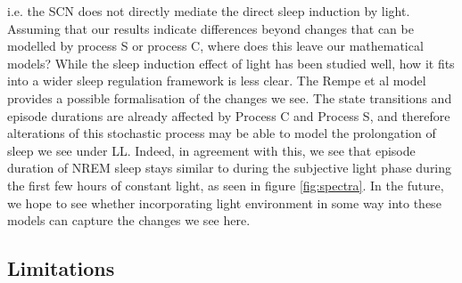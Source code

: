 i.e. the SCN does not directly mediate the direct sleep induction by 
light\cite{rupp_distinct_2019}.
Assuming that our results indicate differences beyond changes that 
can be modelled by process S or process C, where does this leave our 
mathematical models?
While the sleep induction effect of light has been studied well,
how it fits into a wider sleep regulation framework is less 
clear\cite{muindi_retino-hypothalamic_2014}.
The Rempe et al model\cite{rempe_mathematical_2018} provides a possible 
formalisation of the changes we see.
The state transitions and 
episode durations are already affected by Process C and Process S, 
and therefore alterations of this stochastic process may be able 
to model the prolongation of sleep we see under LL.
Indeed, in agreement with this,
we see that episode duration of NREM sleep stays similar to 
during the subjective light phase during the first few hours of constant 
light, as seen in figure \ref{fig:spectra}.
In the future, we hope to see whether incorporating light 
environment in some way into these models can capture the changes we see here. 

\subsection{Limitations}


